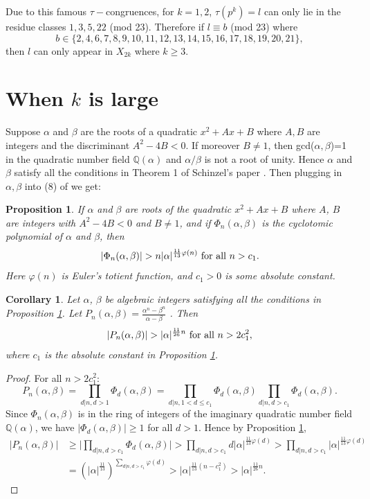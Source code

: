 \documentclass[12pt]{amsart}
\newtheorem{cor}[thm]{Corollary}
\newtheorem{prop}[thm]{Proposition}
\numberwithin{equation}{section}
\begin{document}
Due to this famous $\tau-$congruences, for $k=1,2$, $\tau(p^k)=l$ can only lie in the residue classes $1,3,5,22$ (mod 23).
Therefore if $l\equiv b$ (mod 23) where $$b\in\{2,4,6,7,8,9,10,11,12,13,14,15,16,17,18,19,20,21\},$$then $l$ can only appear in $X_{2k}$ where $k\geq 3$.

\section{When $k$ is large}

Suppose $\alpha$ and $\beta$ are the roots of a quadratic $x^2+Ax+B$ where $A,B$ are integers and the discriminant $A^2-4B<0$. If moreover $B\neq 1$, then gcd($\alpha,\beta$)=1 in the quadratic number field $\mathbb{Q}(\alpha)$ and $\alpha/\beta$ is not a root of unity. Hence $\alpha$ and $\beta$ satisfy all the conditions in Theorem 1 of Schinzel's paper \cite{Schinzel}. Then plugging in $\alpha,\beta$ into (8) of \cite{Schinzel} we get:
\begin{prop}\label{3}
    If $\alpha$ and $\beta$ are roots of the quadratic $x^2+Ax+B$ where $A$, $B$ are integers with $A^2-4B<0$ and $B\neq 1$, and if $\Phi_n(\alpha,\beta)$ is the cyclotomic polynomial of $\alpha$ and $\beta$, then \begin{equation}
    |\Phi_n(\alpha,\beta)|>n|\alpha|^{\frac{11}{13}\varphi(n)} \textup{ for all } n>c_1.
\end{equation}
Here $\varphi(n)$ is Euler's totient function, and $c_1>0$ is some absolute constant.
\end{prop}

\begin{cor}\label{4}
    Let $\alpha$, $\beta$ be algebraic integers satisfying all the conditions in Proposition \ref{3}. Let 
        $P_n(\alpha,\beta)=\frac{\alpha^n-\beta^n}{\alpha-\beta}$
    . Then \begin{equation}
        |P_n(\alpha,\beta)|>|\alpha|^{\frac{11}{26}n}\textup{ for all }n>2c_1^2,
    \end{equation}
    where $c_1$ is the absolute constant in Proposition \ref{3}.
\end{cor}

\begin{proof}
    For all $n>2c_1^2$:
    \begin{equation*}
        P_n(\alpha,\beta)=\prod_{d|n,d>1}\Phi_d(\alpha,\beta)=\prod_{d|n,1<d\leq c_1}\Phi_d(\alpha,\beta)\prod_{d|n,d>c_1}\Phi_d(\alpha,\beta).
    \end{equation*}
    Since $\Phi_n(\alpha,\beta)$ is in the ring of integers of the imaginary quadratic number field $\mathbb{Q}(\alpha)$, we have $|\Phi_d(\alpha,\beta)|\geq1$ for all $d>1$. Hence by Proposition \ref{3}, \begin{align*}
        |P_n(\alpha,\beta)|&\geq\Bigg|\prod_{d|n,d>c_1}\Phi_d(\alpha,\beta)\Bigg|>\prod_{d|n,d>c_1}d|\alpha|^{\frac{11}{13}\varphi(d)}>\prod_{d|n,d>c_1}|\alpha|^{\frac{11}{13}\varphi(d)}\\&=(|\alpha|^{\frac{11}{13}})^{\sum_{d|n,d>c_1}\varphi(d)}>|\alpha|^{\frac{11}{13}(n-c_1^2)}>|\alpha|^{\frac{11}{26}n}.
    \end{align*}
    
\end{proof}
\end{document}
